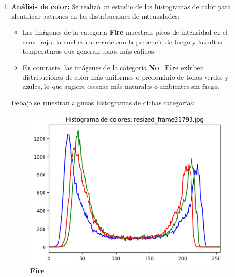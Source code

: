 \begin{enumerate}
    \item \textbf{Análisis de color:}  
      Se realizó un estudio de los histogramas de color para identificar patrones en las distribuciones de intensidades:
      \begin{itemize}
          \item Las imágenes de la categoría \textbf{Fire} muestran picos de intensidad en el canal rojo, 
          lo cual es coherente con la presencia de fuego y las altas temperaturas que generan tonos más cálidos.
          \item En contraste, las imágenes de la categoría \textbf{No\_Fire} exhiben distribuciones 
          de color más uniformes o predominio de tonos verdes y azules, lo que sugiere escenas más naturales 
          o ambientes sin fuego. 
      \end{itemize}
      Debajo se muestran algunos histogramas de dichas categorías:
      \begin{figure}[htbp]
        \centering
        \begin{minipage}[b]{0.45\textwidth}
          \centering
          \includegraphics[width=\linewidth]{images/histograma_fire.png}
          \vspace{0.5em}
          \small\textbf{Fire}
        \end{minipage}
        \hfill
        \begin{minipage}[b]{0.45\textwidth}
          \centering

\end{minipage}
\end{figure}
\end{enumerate}
